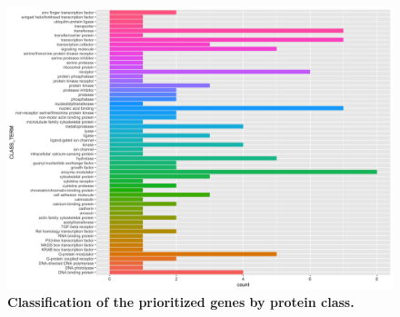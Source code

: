 \begin{figure}[ht]
    \centering
    \includegraphics[width= 14 cm, high= 16cm]{fig/class_term_grep.png}
    \caption{\textbf{Classification of the prioritized genes by protein class. }}
    \label{fig:protClass}
\end{figure}




